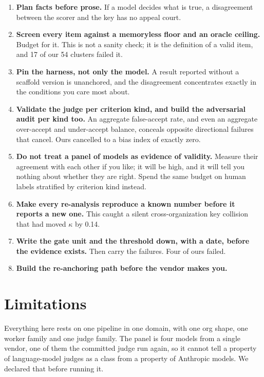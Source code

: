 \documentclass[11pt]{article}
\begin{document}
\begin{enumerate}[leftmargin=1.5em, itemsep=2pt, topsep=3pt]
\item \textbf{Plan facts before prose.} If a model decides what is true, a
  disagreement between the scorer and the key has no appeal court.
\item \textbf{Screen every item against a memoryless floor and an oracle
  ceiling.} Budget for it. This is not a sanity check; it is the definition of
  a valid item, and 17 of our 54 clusters failed it.
\item \textbf{Pin the harness, not only the model.} A result reported without a
  scaffold version is unanchored, and the disagreement concentrates exactly in
  the conditions you care most about.
\item \textbf{Validate the judge per criterion kind, and build the adversarial
  audit per kind too.} An aggregate false-accept rate, and even an aggregate
  over-accept and under-accept balance, conceals opposite directional failures
  that cancel. Ours cancelled to a bias index of exactly zero.
\item \textbf{Do not treat a panel of models as evidence of validity.} Measure
  their agreement with each other if you like; it will be high, and it will
  tell you nothing about whether they are right. Spend the same budget on
  human labels stratified by criterion kind instead.
\item \textbf{Make every re-analysis reproduce a known number before it reports
  a new one.} This caught a silent cross-organization key collision that had
  moved $\kappa$ by 0.14.
\item \textbf{Write the gate unit and the threshold down, with a date, before
  the evidence exists.} Then carry the failures. Four of ours failed.
\item \textbf{Build the re-anchoring path before the vendor makes you.}
\end{enumerate}

\section{Limitations}

Everything here rests on one pipeline in one domain, with one org shape, one
worker family and one judge family. The panel is four models from a single
vendor, one of them the committed judge run again, so it cannot tell a
property of language-model judges as a class from a property of Anthropic
models. We declared that before running it.
\end{document}
